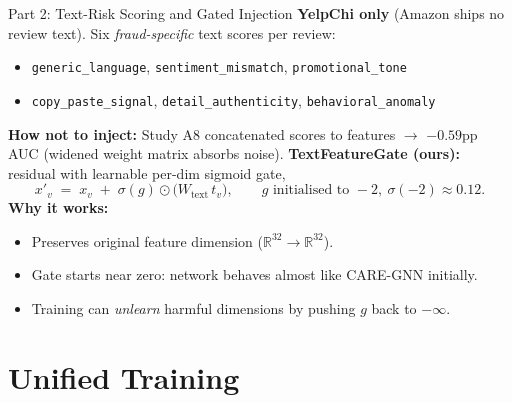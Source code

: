 \documentclass[aspectratio=169,10pt]{beamer}
\begin{document}
\begin{frame}{Part 2: Text-Risk Scoring and Gated Injection}
    \textbf{YelpChi only} (Amazon ships no review text).
    Six \emph{fraud-specific} text scores per review:
    \vspace{0.2em}
    \begin{itemize}\footnotesize
        \item \texttt{generic\_language}, \texttt{sentiment\_mismatch}, \texttt{promotional\_tone}
        \item \texttt{copy\_paste\_signal}, \texttt{detail\_authenticity}, \texttt{behavioral\_anomaly}
    \end{itemize}
    \vspace{0.4em}
    \textbf{How not to inject:} Study A8 concatenated scores to features $\rightarrow$
    $-0.59$pp AUC (widened weight matrix absorbs noise).
    \vspace{0.2em}
    \textbf{TextFeatureGate (ours):} residual with learnable per-dim sigmoid gate,
    \[
        x'_v \;=\; x_v \;+\; \sigma(g) \odot \bigl( W_{\text{text}}\, t_v \bigr),
        \qquad g \text{ initialised to } -2,\ \sigma(-2)\!\approx\!0.12.
    \]
    \vspace{-0.2em}
    \textbf{Why it works:}
    \begin{itemize}\footnotesize
        \item Preserves original feature dimension ($\mathbb{R}^{32}\!\to\!\mathbb{R}^{32}$).
        \item Gate starts near zero: network behaves almost like CARE-GNN initially.
        \item Training can \emph{unlearn} harmful dimensions by pushing $g$ back to $-\infty$.
    \end{itemize}
\end{frame}

\section{Unified Training}
\end{document}
